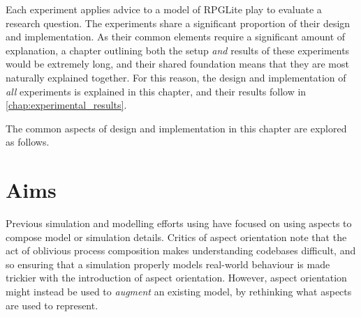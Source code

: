 
Each experiment applies advice to a model of RPGLite play to evaluate a research
question. The experiments share a significant proportion of their design and
implementation. As their common elements require a significant amount of
explanation, a chapter outlining both the setup \emph{and} results of these
experiments would be extremely long, and their shared foundation means that they
are most naturally explained together. For this reason, the design and
implementation of \emph{all} experiments is explained in this chapter, and their
results follow in \cref{chap:experimental_results}.

The common aspects of design and implementation in this chapter are explored as
follows. 



\section{Aims}\label{sec:aop_simulation_optimisation_aims}


Previous simulation and modelling efforts using \aop{} have focused on
using aspects to compose model or simulation details. Critics of aspect orientation
note that the act of oblivious process composition makes understanding codebases
difficult, and so ensuring that a simulation properly models real-world
behaviour is made trickier with the introduction of aspect orientation.
However, aspect orientation might instead be used to \emph{augment} an existing
model, by rethinking what aspects are used to represent.

